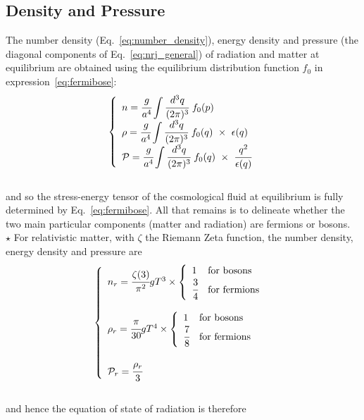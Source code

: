 \subsection{Density and Pressure}

The number density (Eq.~\ref{eq:number_density}), energy density and pressure (the diagonal components of Eq.~\ref{eq:nrj_general}) of radiation and matter at equilibrium are obtained using the equilibrium distribution function $f_0$ in expression~\ref{eq:fermibose}: \\
\begin{equation}
\label{eq:moments}
\left\{
\begin{array}{l}
n = \cfrac{g}{a^4} \displaystyle \int \cfrac{d^3 q}{(2 \pi)^3}~ f_0(p)\\
\rho  = \cfrac{g}{a^4} \displaystyle \int \cfrac{d^3 q}{(2 \pi)^3}~ f_0(q) ~\times~ \epsilon(q) \\
\mathcal{P} = \cfrac{g}{a^4} \displaystyle \int \cfrac{d^3 q}{(2 \pi)^3}~ f_0(q) ~\times~  \cfrac{q^2}{\epsilon(q)}
\end{array}
\right.
\end{equation} \\ and so the stress-energy tensor of the cosmological fluid at equilibrium is fully determined by Eq.~\ref{eq:fermibose}. All that remains is to delineate whether the two main particular components (matter and radiation) are fermions or bosons.\\

$\star$ For relativistic matter, with $\zeta$ the Riemann Zeta function, the number density, energy density and pressure are \\

\begin{equation}
\label{eq:relmat}
\left\{
\begin{array}{l}

n_{r} = \cfrac{\zeta(3)}{\pi^2} g T^3 \times \left\{ \begin{array}{ll}
1 & \text{for bosons}\\
\cfrac{3}{4} & \text{for fermions}
\end{array}
\right. \\
\\
\rho_{r} = \cfrac{\pi}{30} g T^4 \times \left\{ \begin{array}{ll}
1 & \text{for bosons}\\
\cfrac{7}{8} & \text{for fermions}
\end{array}
\right. \\
\\
\mathcal{P}_r = \cfrac{\rho_r}{3}

\end{array}
\right.
\end{equation} \\ and hence the equation of state of radiation is therefore 

